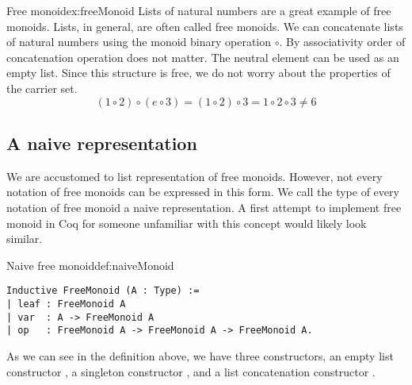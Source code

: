 \begin{example}{Free monoid}{ex:freeMonoid}
Lists of natural numbers are a great example of free monoids. Lists, in general, are often called free monoids. We can concatenate lists of natural numbers using the monoid binary operation $\circ$. By associativity order of concatenation operation does not matter. The neutral element can be used as an empty list. Since this structure is free, we do not worry about the properties of the carrier set.
$$(1 \circ 2) \circ (e \circ 3) = (1 \circ 2) \circ 3 =  1 \circ 2 \circ 3 \not= 6$$
\end{example}
\subsection{A naive representation}
We are accustomed to list representation of free monoids. However, not every notation of free monoids can be expressed in this form. We call the type of every notation of free monoid a naive representation. A first attempt to implement free monoid in Coq for someone unfamiliar with this concept would likely look similar. 
\begin{defi}{Naive free monoid}{def:naiveMonoid}
\begin{verbatim}
Inductive FreeMonoid (A : Type) :=
| leaf : FreeMonoid A
| var  : A -> FreeMonoid A
| op   : FreeMonoid A -> FreeMonoid A -> FreeMonoid A.
\end{verbatim}
\end{defi}
As we can see in the definition above, we have three constructors, an empty list constructor , a singleton constructor , and a list concatenation constructor . 
